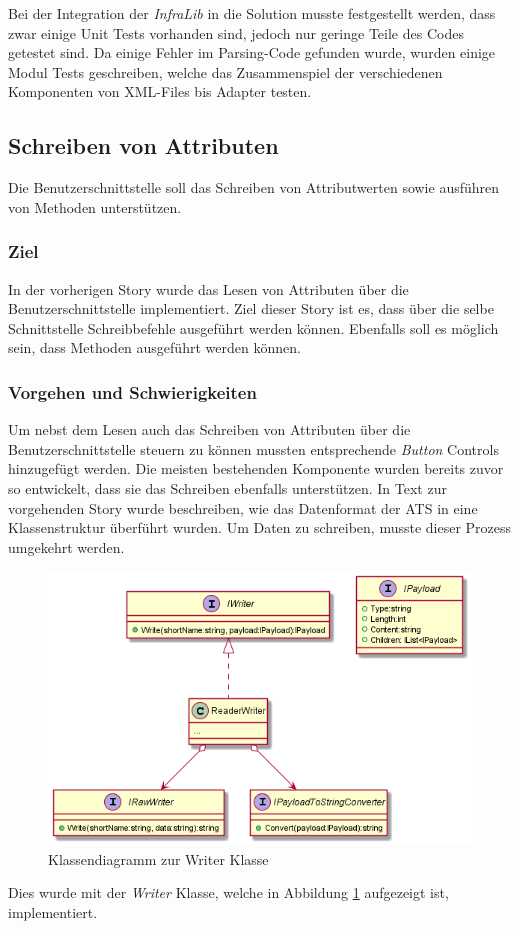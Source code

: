 Bei der Integration der \textit{InfraLib} in die Solution musste festgestellt werden, dass zwar einige Unit Tests vorhanden sind, jedoch nur geringe Teile des Codes getestet sind.
Da einige Fehler im Parsing-Code gefunden wurde, wurden einige Modul Tests geschreiben, welche das Zusammenspiel der verschiedenen Komponenten von XML-Files bis Adapter testen.


\subsection{Schreiben von Attributen}
\dq  Die Benutzerschnittstelle soll das Schreiben von Attributwerten sowie ausführen von Methoden unterstützen.\dq

\subsubsection{Ziel}
In der vorherigen Story wurde das Lesen von Attributen über die Benutzerschnittstelle implementiert.
Ziel dieser Story ist es, dass über die selbe Schnittstelle Schreibbefehle ausgeführt werden können.
Ebenfalls soll es möglich sein, dass Methoden ausgeführt werden können.

\subsubsection{Vorgehen und Schwierigkeiten}
Um nebst dem Lesen auch das Schreiben von Attributen über die Benutzerschnittstelle steuern zu können mussten entsprechende \textit{Button} Controls hinzugefügt werden.
Die meisten bestehenden Komponente wurden bereits zuvor so entwickelt, dass sie das Schreiben ebenfalls unterstützen.
In Text zur vorgehenden Story wurde beschreiben, wie das Datenformat der \ac{ATS} in eine Klassenstruktur überführt wurden.
Um Daten zu schreiben, musste dieser Prozess umgekehrt werden.

\begin{figure}
   \centering
   \includegraphics[width=1.0\textwidth]{gfx/payloadTostriing.png}
   \caption{
      Klassendiagramm zur Writer Klasse
      }
      \label{fig:writer}
   \end{figure}
Dies wurde mit der \textit{Writer} Klasse, welche in Abbildung \ref{fig:writer} aufgezeigt ist, implementiert.


